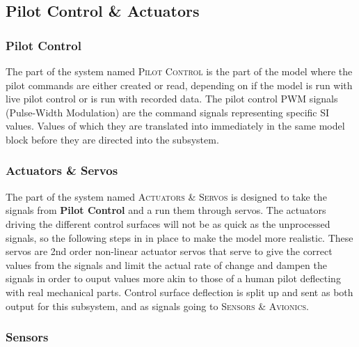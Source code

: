 \subsection{Pilot Control	\& Actuators}

\subsubsection{Pilot Control}

The part of the system named \textsc{Pilot Control} is the part of the model where the pilot commands are either created or read, depending on if the model is run with live pilot control or is run with recorded data. The pilot control PWM signals (Pulse-Width Modulation) are the command signals representing specific SI values. Values of which they are translated into immediately in the same model block before they are directed into the  subsystem.

\subsubsection{Actuators \& Servos}

The part of the system named \textsc{Actuators \& Servos} is designed to take the signals from \textbf{Pilot Control} and a run them through servos. The actuators driving the different control surfaces will not be as quick as the unprocessed signals, so the following steps in in place to make the model more realistic. These servos are 2nd order non-linear actuator servos that serve to give the correct values from the signals and limit the actual rate of change and dampen the signals in order to ouput values more akin to those of a human pilot deflecting with real mechanical parts. Control surface deflection is split up and sent as both output for this subsystem, and as signals going to \textsc{Sensors \& Avionics}.

\subsubsection{Sensors}

